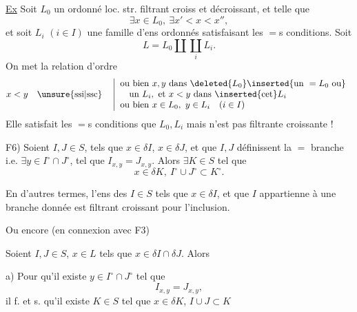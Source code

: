 \uline{Ex} Soit $L_0$ un ordonné     loc. str. filtrant croiss et décroissant, et telle que
\[
\exists x\in L_0,\ \exists x'<x<x'',
\]
et soit $L_i$ $(i\in I)$ une famille d'ens ordonnés satisfaisant les $=$s conditions. Soit
\[
L=L_0\amalg\coprod_iL_i.
\]
On met la relation d'ordre
\[
x<y\quad\unsure{\text{ssi}|\text{ssc}}\quad
\left|
\begin{array}{l}
\text{ou bien }x,y\text{ dans }\deleted{L_0}\inserted{\text{un }=L_0\text{ ou}}\\
\quad\text{un }L_i,\text{ et }x<y\text{ dans }\inserted{\text{cet}}L_i\\
\text{ou bien }x\in L_0,\ y\in L_i\quad(i\in I)
\end{array}
\right.
\]
Elle satisfait les $=$s conditions que $L_0,L_i$ mais n'est pas filtrante croissante !




F6) Soient $I,J\in S$,  tels que $x\in\delta I$, $x\in\delta J$, et que $I,J$ définissent la $=$ branche i.e. $\exists y\in I^\circ\cap J^\circ$,  tel que $I_{x,y}=J_{x,y}$. Alors $\exists K\in S$ tel que
\[
x\in\delta K,\ I^\circ\cup J^\circ\subset K^\circ.
\]

En d'autres termes, l'ens des  $I\in S$ tels que $x\in\delta I$, et que $I$ appartienne à une branche donnée  est filtrant croissant pour l'inclusion.


Ou encore (en connexion avec F3)

Soient $I,J\in S$, $x\in L$ tels que $x\in\delta I\cap\delta J$. Alors

a) Pour qu'il existe $y\in I^\circ\cap J^\circ$ tel que
\[
I_{x,y}=J_{x,y},
\]
il f. et s. qu'il existe $K\in S$ tel que $x\in\delta K$, $I\cup J\subset K$

